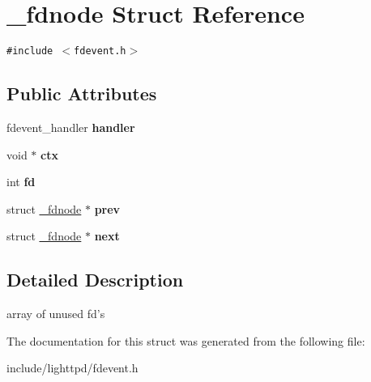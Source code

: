 \hypertarget{struct__fdnode}{
\section{\_\-fdnode Struct Reference}
\label{struct__fdnode}
}
{\tt \#include $<$fdevent.h$>$}

\subsection*{Public Attributes}
\begin{CompactItemize}
\item 
\hypertarget{struct__fdnode_197ee75ecdf4018d2b6eec823dc67ff4}{
fdevent\_\-handler \textbf{handler}}
\label{struct__fdnode_197ee75ecdf4018d2b6eec823dc67ff4}

\item 
\hypertarget{struct__fdnode_b89a325bfe82c899da15e739a15925b4}{
void $\ast$ \textbf{ctx}}
\label{struct__fdnode_b89a325bfe82c899da15e739a15925b4}

\item 
\hypertarget{struct__fdnode_00a11f60bb26e73cb7fb6e84bb4ffbc4}{
int \textbf{fd}}
\label{struct__fdnode_00a11f60bb26e73cb7fb6e84bb4ffbc4}

\item 
\hypertarget{struct__fdnode_67eb5eaee2c2e43654d70954da4ce6cc}{
struct \hyperlink{struct__fdnode}{\_\-fdnode} $\ast$ \textbf{prev}}
\label{struct__fdnode_67eb5eaee2c2e43654d70954da4ce6cc}

\item 
\hypertarget{struct__fdnode_d6809dc25a8f98514886f9a2fea86a54}{
struct \hyperlink{struct__fdnode}{\_\-fdnode} $\ast$ \textbf{next}}
\label{struct__fdnode_d6809dc25a8f98514886f9a2fea86a54}

\end{CompactItemize}


\subsection{Detailed Description}
array of unused fd's 

The documentation for this struct was generated from the following file:\begin{CompactItemize}
\item 
include/lighttpd/fdevent.h\end{CompactItemize}

